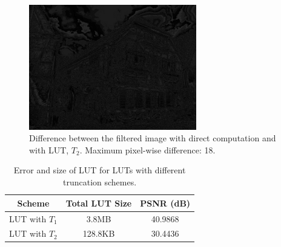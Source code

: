 \documentclass{beamer}
\begin{document}
\begin{frame}
\begin{figure}[h!]
  \centering
    \includegraphics[width=0.65\textwidth]{house_difference_424.png}
    \caption{Difference between the filtered image with direct computation and with LUT, $T_2$. Maximum pixel-wise difference: 18.}
\end{figure}
\end{frame}





\begin{frame}
\begin{center}
\begin{table}
	 
    \begin{tabular}{ | c | c| c |}
    \hline
    Scheme & Total LUT Size & PSNR (dB) \\ \hline
    LUT with $T_1$ & 3.8MB & 40.9868 \\ \hline
    LUT with $T_2$ & 128.8KB & 30.4436 \\ \hline   
    \end{tabular}
    \bigskip
    
    \caption{Error and size of LUT for LUTs with different truncation schemes.}
\end{table} \label{tbl:high_pass}
\end{center}
 \end{frame}
\end{document}
